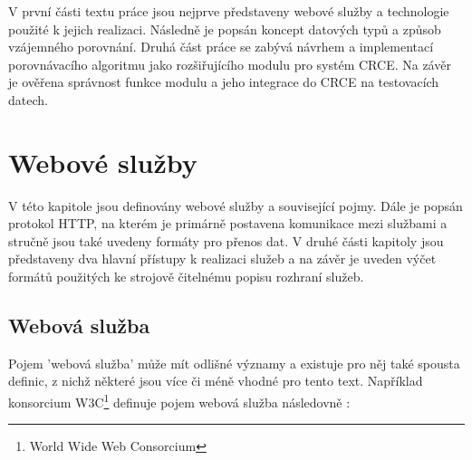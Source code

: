 \documentclass[czech,DP]{thesiskiv}
\begin{document}
V první části textu práce jsou nejprve představeny webové služby a technologie použité k jejich realizaci. Následně je popsán koncept datových typů a způsob vzájemného porovnání. Druhá část práce se zabývá návrhem a implementací porovnávacího algoritmu jako rozšiřujícího modulu pro systém CRCE. Na závěr je ověřena správnost funkce modulu a jeho integrace do CRCE na testovacích datech.

\chapter{Webové služby}
\label{sec:web-services-principles}

V této kapitole jsou definovány webové služby a související pojmy. Dále je popsán protokol HTTP, na kterém je primárně postavena komunikace mezi službami a stručně jsou také uvedeny formáty pro přenos dat. V druhé části kapitoly jsou představeny dva hlavní přístupy k realizaci služeb a na závěr je uveden výčet formátů použitých ke strojově čitelnému popisu rozhraní služeb.

%

\section{Webová služba}




Pojem 'webová služba' může mít odlišné významy \cite{w3cWsDesignIssues} a existuje pro něj také spousta definic, z nichž některé jsou více či méně vhodné pro tento text. Například konsorcium W3C\footnote{World Wide Web Consorcium} definuje pojem webová služba následovně \cite{w3cWsArch}:
\end{document}
